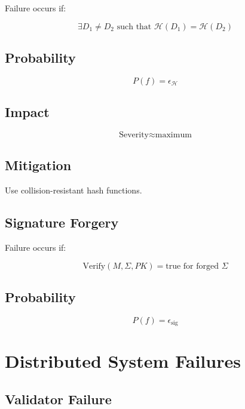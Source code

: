 Failure occurs if:

\begin{equation}
\exists D_1 \neq D_2 \text{ such that } \mathcal{H}(D_1) = \mathcal{H}(D_2)
\end{equation}

\subsection{Probability}

\begin{equation}
P(f) = \epsilon_{\mathcal{H}}
\end{equation}

\subsection{Impact}

\begin{equation}
\text{Severity} \approx \text{maximum}
\end{equation}

\subsection{Mitigation}

Use collision-resistant hash functions.

\subsection{Signature Forgery}

Failure occurs if:

\begin{equation}
\text{Verify}(M, \Sigma, PK) = \text{true} \text{ for forged } \Sigma
\end{equation}

\subsection{Probability}

\begin{equation}
P(f) = \epsilon_{\text{sig}}
\end{equation}

\section{Distributed System Failures}

\subsection{Validator Failure}

